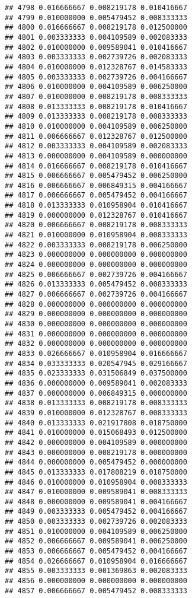 \documentclass[
]{article}
\begin{document}
\begin{verbatim}
## 4798 0.016666667 0.008219178 0.010416667
## 4799 0.010000000 0.005479452 0.008333333
## 4800 0.016666667 0.008219178 0.012500000
## 4801 0.003333333 0.004109589 0.002083333
## 4802 0.010000000 0.009589041 0.010416667
## 4803 0.003333333 0.002739726 0.002083333
## 4804 0.010000000 0.012328767 0.014583333
## 4805 0.003333333 0.002739726 0.004166667
## 4806 0.010000000 0.004109589 0.006250000
## 4807 0.010000000 0.008219178 0.008333333
## 4808 0.013333333 0.008219178 0.010416667
## 4809 0.013333333 0.008219178 0.008333333
## 4810 0.010000000 0.004109589 0.006250000
## 4811 0.006666667 0.012328767 0.012500000
## 4812 0.003333333 0.004109589 0.002083333
## 4813 0.000000000 0.004109589 0.000000000
## 4814 0.016666667 0.008219178 0.010416667
## 4815 0.006666667 0.005479452 0.006250000
## 4816 0.006666667 0.006849315 0.004166667
## 4817 0.006666667 0.005479452 0.004166667
## 4818 0.013333333 0.010958904 0.010416667
## 4819 0.000000000 0.012328767 0.010416667
## 4820 0.006666667 0.008219178 0.008333333
## 4821 0.010000000 0.010958904 0.008333333
## 4822 0.003333333 0.008219178 0.006250000
## 4823 0.000000000 0.000000000 0.000000000
## 4824 0.000000000 0.000000000 0.000000000
## 4825 0.006666667 0.002739726 0.004166667
## 4826 0.013333333 0.005479452 0.008333333
## 4827 0.006666667 0.002739726 0.004166667
## 4828 0.000000000 0.000000000 0.000000000
## 4829 0.000000000 0.000000000 0.000000000
## 4830 0.000000000 0.000000000 0.000000000
## 4831 0.000000000 0.000000000 0.000000000
## 4832 0.000000000 0.000000000 0.000000000
## 4833 0.026666667 0.010958904 0.016666667
## 4834 0.033333333 0.020547945 0.029166667
## 4835 0.023333333 0.031506849 0.037500000
## 4836 0.000000000 0.009589041 0.002083333
## 4837 0.000000000 0.006849315 0.000000000
## 4838 0.013333333 0.008219178 0.008333333
## 4839 0.010000000 0.012328767 0.008333333
## 4840 0.013333333 0.021917808 0.018750000
## 4841 0.010000000 0.015068493 0.012500000
## 4842 0.000000000 0.004109589 0.000000000
## 4843 0.000000000 0.008219178 0.000000000
## 4844 0.000000000 0.005479452 0.000000000
## 4845 0.013333333 0.017808219 0.018750000
## 4846 0.010000000 0.010958904 0.008333333
## 4847 0.010000000 0.009589041 0.008333333
## 4848 0.000000000 0.009589041 0.004166667
## 4849 0.003333333 0.005479452 0.004166667
## 4850 0.003333333 0.002739726 0.002083333
## 4851 0.010000000 0.004109589 0.006250000
## 4852 0.006666667 0.009589041 0.006250000
## 4853 0.006666667 0.005479452 0.004166667
## 4854 0.026666667 0.010958904 0.016666667
## 4855 0.003333333 0.001369863 0.002083333
## 4856 0.000000000 0.000000000 0.000000000
## 4857 0.006666667 0.005479452 0.008333333

\end{verbatim}
\end{document}
